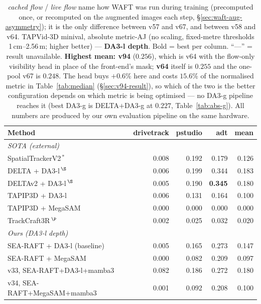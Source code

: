 \documentclass[11pt,a4paper]{article}
\begin{document}
\begin{table}[!ht]
\centering
\caption{\emph{cached flow} / \emph{live flow} name how WAFT was run during training
         (precomputed once, or recomputed on the augmented images each step,
         \S\ref{sec:waft-aug-asymmetry}); it is the only difference between v57 and v67, and between
         v58 and v64.
         TAPVid-3D minival, absolute metric-AJ (no scaling, fixed-metre thresholds 1\,cm--2.56\,m;
higher better) --- \textbf{DA3-l depth}. Bold = best per column. ``---'' = result unavailable.
\textbf{Highest mean: v94} ($0.256$), which is v64 with the flow-only visibility head in place of the front-end's mask; \textbf{v64} itself is $0.255$ and the one-pool v67 is $0.248$. The head buys $+0.6\%$ here and costs $15.6\%$ of the normalised metric in Table~\ref{tab:median} (\S\ref{sec:v94-result}), so which of the two is the better configuration depends on which metric is being optimised --- no DA3-g pipeline
reaches it (best DA3-g is DELTA$+$DA3-g at $0.227$, Table~\ref{tab:abs-g}).
All numbers are produced by our own evaluation pipeline on the same hardware.}
\label{tab:abs}
\footnotesize
\begin{tabular}{lrrrr}
\toprule
Method & drivetrack & pstudio & adt & mean \\
\midrule
\multicolumn{5}{l}{\emph{SOTA (external)}} \\
SpatialTrackerV2\,$^{*}$         & 0.008 & 0.192 & 0.179 & 0.126 \\
DELTA + DA3-l\,$^{\S}$             & 0.006 & 0.199 & 0.344 & 0.183 \\
DELTAv2 + DA3-l\,$^{\S}$           & 0.005 & 0.190 & \textbf{0.345} & 0.180 \\
TAPIP3D + DA3-l                    & 0.006 & 0.131 & 0.164 & 0.100 \\
TAPIP3D + MegaSAM                & 0.000 & 0.000 & 0.000 & 0.000 \\
TrackCraft3R\,$^{\P}$            & 0.002 & 0.025 & 0.032 & 0.020 \\
\midrule
\multicolumn{5}{l}{\emph{Ours (DA3-l depth)}} \\
SEA-RAFT + DA3-l (baseline)        & 0.005 & 0.165 & 0.273 & 0.147 \\
SEA-RAFT + MegaSAM               & 0.000 & 0.082 & 0.209 & 0.097 \\
v33, SEA-RAFT+DA3-l+mamba3            & 0.082 & 0.186 & 0.272 & 0.180 \\
v34, SEA-RAFT+MegaSAM+mamba3        & 0.001 & 0.092 & 0.208 & 0.100 \\

\end{tabular}
\end{table}
\end{document}
